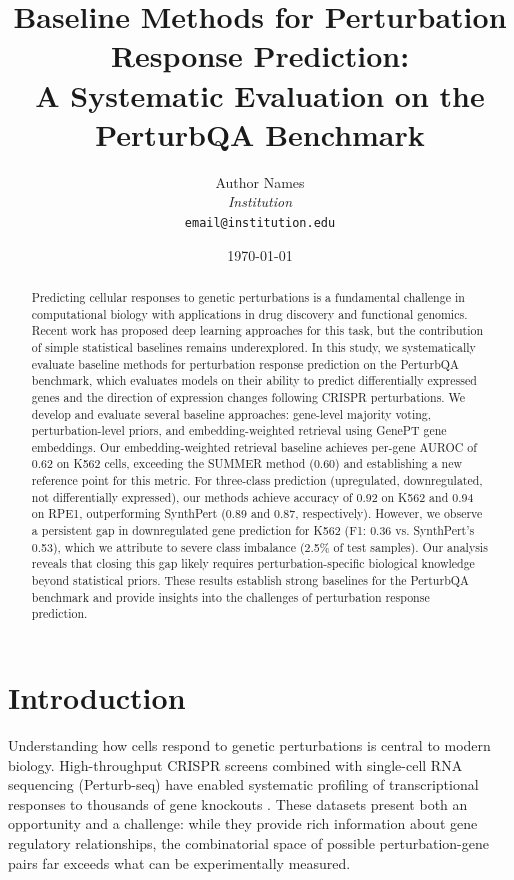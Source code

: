 \documentclass[11pt]{article}
\title{Baseline Methods for Perturbation Response Prediction: \\
A Systematic Evaluation on the PerturbQA Benchmark}
\author{
  Author Names\\
  \textit{Institution}\\
  \texttt{email@institution.edu}
}
\date{\today}
\begin{document}
\maketitle

\begin{abstract}
Predicting cellular responses to genetic perturbations is a fundamental challenge in computational biology with applications in drug discovery and functional genomics. Recent work has proposed deep learning approaches for this task, but the contribution of simple statistical baselines remains underexplored. In this study, we systematically evaluate baseline methods for perturbation response prediction on the PerturbQA benchmark, which evaluates models on their ability to predict differentially expressed genes and the direction of expression changes following CRISPR perturbations. We develop and evaluate several baseline approaches: gene-level majority voting, perturbation-level priors, and embedding-weighted retrieval using GenePT gene embeddings. Our embedding-weighted retrieval baseline achieves per-gene AUROC of 0.62 on K562 cells, exceeding the SUMMER method (0.60) and establishing a new reference point for this metric. For three-class prediction (upregulated, downregulated, not differentially expressed), our methods achieve accuracy of 0.92 on K562 and 0.94 on RPE1, outperforming SynthPert (0.89 and 0.87, respectively). However, we observe a persistent gap in downregulated gene prediction for K562 (F1: 0.36 vs. SynthPert's 0.53), which we attribute to severe class imbalance (2.5\% of test samples). Our analysis reveals that closing this gap likely requires perturbation-specific biological knowledge beyond statistical priors. These results establish strong baselines for the PerturbQA benchmark and provide insights into the challenges of perturbation response prediction.
\end{abstract}

\section{Introduction}

Understanding how cells respond to genetic perturbations is central to modern biology. High-throughput CRISPR screens combined with single-cell RNA sequencing (Perturb-seq) have enabled systematic profiling of transcriptional responses to thousands of gene knockouts \citep{dixit2016perturb, adamson2016multiplexed}. These datasets present both an opportunity and a challenge: while they provide rich information about gene regulatory relationships, the combinatorial space of possible perturbation-gene pairs far exceeds what can be experimentally measured.
\end{document}
